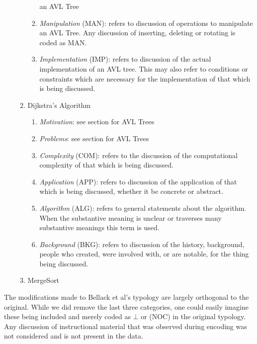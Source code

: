 \documentclass[conference]{IEEEtran}
\begin{document}
\begin{enumerate}[M1.]
\begin{enumerate}
\begin{enumerate}
            an AVL Tree
          \item \emph{Manipulation} (MAN): refers to discussion of operations to
            manipulate an AVL Tree. Any discussion of inserting, deleting or
            rotating is coded as MAN.
          \item \emph{Implementation} (IMP): refers to discussion of the actual
            implementation of an AVL tree. This may also refer to conditions or
            constraints which are necessary for the implementation of that which
            is being discussed.
        \end{enumerate}
      \item{Dijkstra's Algorithm}
        \begin{enumerate}
          \item \emph{Motivation}: see section for AVL Trees
          \item \emph{Problems}: see section for AVL Trees
          \item \emph{Complexity} (COM): refers to the discussion of the computational
            complexity of that which is being discussed. 
          \item \emph{Application} (APP): refers to discussion of the application of
            that which is being discussed, whether it be concrete or abstract.
          \item \emph{Algorithm} (ALG): refers to general statements about the
            algorithm. When the substantive meaning is unclear or traverses many
            substantive meanings this term is used.
          \item \emph{Background} (BKG): refers to discussion of the history,
            background, people who created, were involved with, or are notable,
            for the thing being discussed.
        \end{enumerate}
      \item{MergeSort}
    \end{enumerate}
\end{enumerate}

The modifications made to Bellack et al's typology are largely orthogonal to the
original. While we did remove the last three categories, one could easily
imagine these being included and merely coded as $\bot$ or (NOC) in the original
typology. Any discussion of instructional material that was observed during
encoding was not considered and is not present in the data.
\end{document}
